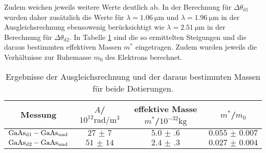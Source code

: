 Zudem weichen jeweils weitere Werte deutlich ab. In der Berechnung für $\Delta \theta_{\mathrm{d1}}$ wurden daher zusätzlich die Werte für $\lambda=\SI{1.06}{\micro\meter}$ und $\lambda=\SI{1.96}{\micro\meter}$ in der Ausgleichsrechnung ebensowenig berücksichtigt wie $\lambda=\SI{2.51}{\micro\meter}$ in der Berechnung für
 $\Delta \theta_{\mathrm{d2}}$.
In Tabelle \ref{tab:steigung} sind die so ermittelten Steigungen und die daraus bestimmten effektiven Massen $m^{*}$ eingetragen. Zudem wurden jeweils die Verhältnisse zur Ruhemasse $m_{0}$ des Elektrons berechnet.
\begin{table}
  \centering
  \caption{Ergebnisse der Ausgleichsrechnung und der daraus bestimmten Massen für beide Dotierungen.}
  \label{tab:steigung}
  \begin{tabular}{cccc}
    \toprule
    Messung&$A$/$10^{12}\si{\radian\per\cubic\metre}$&effektive Masse  $m^{*}$/$10^{-32}\si{\kilo\gram}$&$m^{*}$/$m_{0}$\\
    \midrule
    $\ce{GaAs}_{\mathrm{d1}}-\ce{GaAs}_{\mathrm{und}}$&$\num{27(7)}$&$\num{5.0(6)}$&$\num{0.055(7)}$\\
    $\ce{GaAs}_{\mathrm{d2}}-\ce{GaAs}_{\mathrm{und}}$&$\num{51(14)}$&$\num{2.4(3)}$&$\num{0.027(4)}$\\
    \bottomrule
  \end{tabular}
\end{table}

